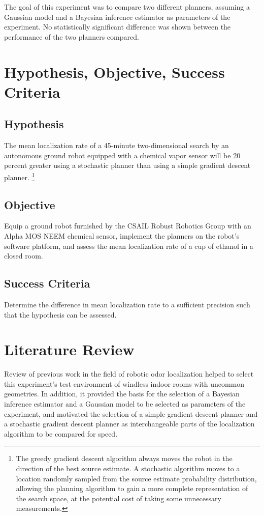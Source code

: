 \documentclass[submit, 12pt]{aiaa-pretty-modified}
\begin{document}
The goal of this experiment was to compare two different planners,
assuming a Gaussian model and a Bayesian inference estimator as
parameters of the experiment.  No statistically significant difference
was shown between the performance of the two planners compared.

\section{Hypothesis, Objective, Success Criteria}
\label{sec:hos}
\subsection*{Hypothesis} 
The mean localization rate of a 45-minute two-dimensional search by an
autonomous ground robot equipped with a chemical vapor sensor will be 20 percent
greater using a stochastic planner than using a simple gradient descent planner.
\footnote{ The greedy gradient descent algorithm always moves the robot in the
  direction of the best source estimate. A stochastic algorithm moves to a
  location randomly sampled from the source estimate probability distribution,
  allowing the planning algorithm to gain a more complete representation of the
  search space, at the potential cost of taking some unnecessary measurements.}

\subsection*{Objective}
Equip a ground robot furnished by the CSAIL Robust Robotics Group with an Alpha MOS NEEM chemical sensor, implement the planners on the robot's software platform, and assess the mean localization rate of a cup of ethanol in a closed room.

\subsection*{Success Criteria} 
Determine the difference in mean localization rate to a sufficient precision such that the hypothesis can be assessed.

\section{Literature Review}
\label{sec:lit-review}
Review of previous work in the field of robotic odor localization helped to select
this experiment's test environment of windless indoor rooms with uncommon
geometries. In addition, it provided the basis for the selection of a Bayesian inference
estimator and a Gaussian model to be selected as parameters of the experiment, and
motivated the selection of a simple gradient descent planner and a stochastic
gradient descent planner as interchangeable parts of the localization algorithm
to be compared for speed.
\end{document}
